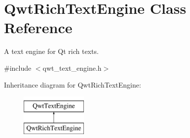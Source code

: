 \hypertarget{class_qwt_rich_text_engine}{\section{Qwt\-Rich\-Text\-Engine Class Reference}
\label{class_qwt_rich_text_engine}
}


A text engine for Qt rich texts.  




{\ttfamily \#include $<$qwt\-\_\-text\-\_\-engine.\-h$>$}

Inheritance diagram for Qwt\-Rich\-Text\-Engine\-:\begin{figure}[H]
\begin{center}
\leavevmode
\includegraphics[height=2.000000cm]{class_qwt_rich_text_engine}
\end{center}
\end{figure}
